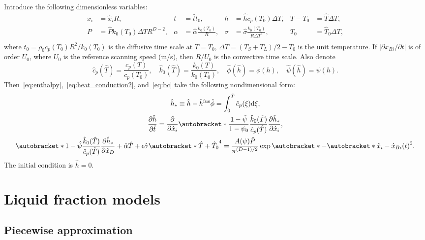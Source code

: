 \documentclass{article}
\newcommand{\pder}[2][]{\frac{\partial#1}{\partial#2}}
\newcommand{\Pder}[2][]{\partial#1/\partial#2}
\DeclarePairedDelimiter\autobracket()       %
\newcommand{\br}[1]{\autobracket*{#1}}
\newcommand{\dd}{\mathrm{d}}
\newcommand{\fusion}[1]{{#1}^\mathrm{fus}}
\begin{document}
Introduce the following dimensionless variables:
\begin{equation}\label{eq:dimensionless}
    \begin{aligned}
        x_i &= \hat{x}_iR, & t &= \hat{t}t_0, & h &= \hat{h}c_p(T_0)\Delta{T}, & T - T_0 &= \hat{T}\Delta{T}, \\
        P &= \hat{P} k_0(T_0)\Delta{T}R^{D-2}, & \alpha &= \hat{\alpha}\frac{k_0(T_0)}R, &
            \sigma &= \hat{\sigma}\frac{k_0(T_0)}{R\Delta{T}^3}, & T_0 &= \hat{T}_0\Delta{T}, \\
    \end{aligned}
\end{equation}
where \(t_0 = \rho_0 c_p(T_0) R^2/k_0(T_0)\) is the diffusive time scale at \(T=T_0\),
\(\Delta{T} = (T_S+T_L)/2 - T_0\) is the unit temperature.
If \(|\Pder[x_{Bi}]{t}|\) is of order \(U_0\), where \(U_0\) is the reference scanning speed (\si{m/s}),
then \(R/U_0\) is the convective time scale. Also denote
\begin{equation}
    \hat{c}_p(\hat{T}) = \frac{c_p(T)}{c_p(T_0)}, \quad
    \hat{k}_0(\hat{T}) = \frac{k_0(T)}{k_0(T_0)}, \quad
    \hat{\phi}(\hat{h}) = \phi(h), \quad
    \hat{\psi}(\hat{h}) = \psi(h).
\end{equation}
Then~\eqref{eq:enthalpy},~\eqref{eq:heat_conduction2}, and~\eqref{eq:bc} take the following nondimensional form:
\begin{gather}
	\hat{h}_* \equiv \hat{h} - \fusion{\hat{h}}\hat{\phi} = \int_0^{\hat{T}} \hat{c}_p(\xi)\dd\xi, \label{eq:enthalpy_hats} \\
	\pder[\hat{h}]{\hat{t}} = \pder{\hat{x}_i}\br{
	    \frac{1-\hat{\psi}}{1-\psi_0}
	    \frac{\hat{k}_0(\hat{T})}{\hat{c}_p(\hat{T})}\pder[\hat{h}_*]{\hat{x}_i}
	}, \label{eq:heat_conduction_hats} \\
	\br{1 - \hat{\psi}} \frac{\hat{k}_0(\hat{T})}{\hat{c}_p(\hat{T})}\pder[\hat{h}_*]{\hat{x}_D} +
	    \hat{\alpha}\hat{T} + \epsilon\hat{\sigma} \br{ \hat{T} + \hat{T}_0 }^4 =
	    \frac{A(\psi)\hat{P}}{\pi^{(D-1)/2}}\exp\br{ -\br{ \hat{x}_i-\hat{x}_{Bi}(t) }^2 }. \label{eq:bc_hats}
\end{gather}
The initial condition is \(\hat{h} = 0\).

\section{Liquid fraction models}

\subsection{Piecewise approximation}
\end{document}
